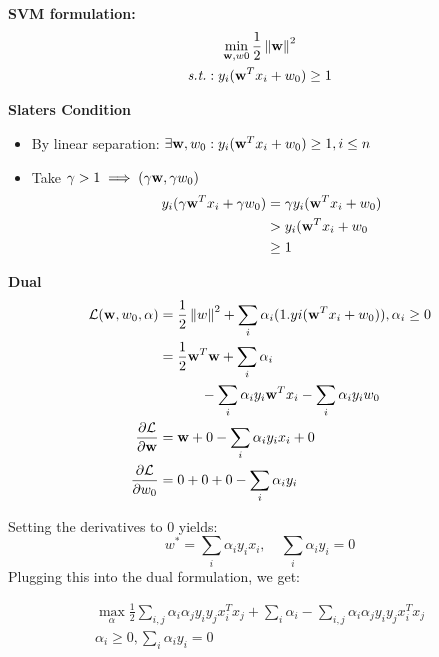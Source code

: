 \textbf{SVM formulation: } 
\begin{equation*}
	\begin{gathered}
		\min_{\mathbf w, w0}\frac{1}{2}\left\lVert\mathbf w\right\rVert^2 \\
		\textit{s.t.}:  y_i(\mathbf w^T x_i + w_0) \geq 1
	\end{gathered}
\end{equation*}

\textbf{Slaters Condition}
\begin{itemize}
	\item By linear separation: $\exists \mathbf w, w_0: y_i(\mathbf w^T x_i + w_0)\geq 1, i\leq n$
	\item Take $\gamma>1 \implies (\gamma\mathbf w, \gamma w_0)$
	\begin{align*}
		y_i(\gamma\mathbf w^T x_i + \gamma w_0) &= \gamma y_i(\mathbf w^T x_i + w_0) \\
										&> y_i(\mathbf w^T x_i + w_0 \\
										&\geq 1
	\end{align*}
\end{itemize}


\textbf{Dual}
\begin{align*}
	\mathcal L(\mathbf w, w_0, \alpha) &= \frac{1}{2}\left\lVert w\right\rVert^2 + \sum_i\alpha_i(1. yi(\mathbf w^Tx_i + w_0)), \alpha_i \geq 0 \\
	&= \frac{1}{2}\mathbf w^T\mathbf w + \sum_i\alpha_i \\
	&\quad\quad\quad- \sum_i\alpha_i y_i\mathbf w^Tx_i - \sum_i\alpha_i y_i w_0 \\
	\frac{\partial\mathcal L}{\partial \mathbf w} &= \mathbf w + 0- \sum_i\alpha_i y_i x_i + 0 \\
	\frac{\partial\mathcal L}{\partial w_0} &= 0 + 0 + 0 - \sum_i\alpha_i y_i
\end{align*}

Setting the derivatives to $0$ yields:
\begin{equation*}
	w^* = \sum_i\alpha_i y_i x_i, \quad \sum_i \alpha_i y_i = 0 
\end{equation*}
Plugging this into the dual formulation, we get:

\begin{equation*}
	\begin{gathered}
		\max_\alpha \frac{1}{2}\sum_{i,j} \alpha_i\alpha_jy_iy_jx_i^Tx_j + \sum_i \alpha_i - \sum_{i,j} \alpha_i\alpha_jy_iy_jx_i^Tx_j \\
		\alpha_i\geq 0, \sum_i\alpha_i y_i = 0
	\end{gathered}
\end{equation*}

